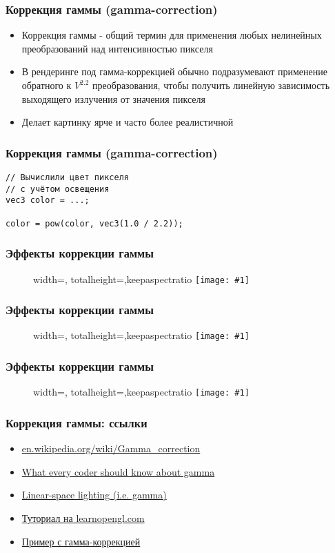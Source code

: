 \documentclass{beamer}
\newcommand{\slideimage}[1]{
  \begin{figure}
    \begin{adjustbox}{width=\textwidth, totalheight=\textheight-2\baselineskip-2\baselineskip,keepaspectratio}
      \texttt{[image: \#1]}
    \end{adjustbox}
  \end{figure}
}
\begin{document}

\begin{frame}[fragile]
\frametitle{Коррекция гаммы (gamma-correction)}
\begin{itemize}
\item Коррекция гаммы - общий термин для применения любых нелинейных преобразований над интенсивностью пикселя
\pause
\item В рендеринге под гамма-коррекцией обычно подразумевают применение обратного к \begin{math}V^{2.2}\end{math} преобразования, чтобы получить линейную зависимость выходящего излучения от значения пикселя
\pause
\item Делает картинку ярче и часто более реалистичной
\end{itemize}
\end{frame}

\begin{frame}[fragile]
\frametitle{Коррекция гаммы (gamma-correction)}
\begin{verbatim}
// Вычислили цвет пикселя
// с учётом освещения
vec3 color = ...;

color = pow(color, vec3(1.0 / 2.2));
\end{verbatim}
\end{frame}

\begin{frame}[fragile]
\frametitle{Эффекты коррекции гаммы}
\slideimage{gamma-ex1.png}
\end{frame}

\begin{frame}[fragile]
\frametitle{Эффекты коррекции гаммы}
\slideimage{gamma-ex2.png}
\end{frame}

\begin{frame}[fragile]
\frametitle{Эффекты коррекции гаммы}
\slideimage{gamma-ex3.png}
\end{frame}

\begin{frame}[fragile]
\frametitle{Коррекция гаммы: ссылки}
\begin{itemize}
\item \href{https://en.wikipedia.org/wiki/Gamma_correction}{en.wikipedia.org/wiki/Gamma\_correction}
\item \href{http://blog.johnnovak.net/2016/09/21/what-every-coder-should-know-about-gamma}{What every coder should know about gamma}
\item \href{http://filmicworlds.com/blog/linear-space-lighting-i-e-gamma}{Linear-space lighting (i.e. gamma)}
\item \href{https://learnopengl.com/Advanced-Lighting/Gamma-Correction}{Туториал на learnopengl.com}
\item \href{https://github.com/lisyarus/graphics-course-practice/tree/master/gamma-correction}{Пример с гамма-коррекцией}
\end{itemize}
\end{frame}
\end{document}
